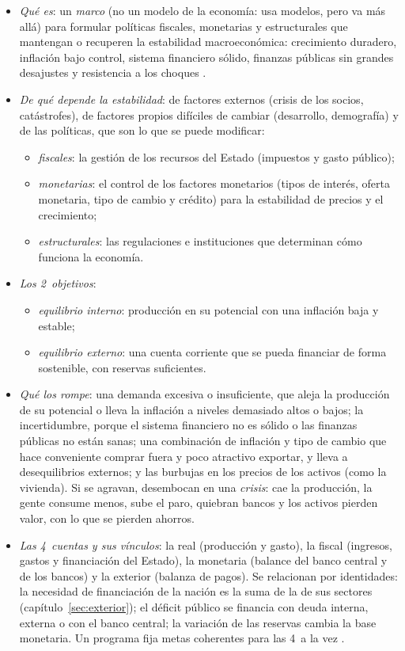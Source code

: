 \documentclass[11pt]{article}
\begin{document}
\begin{itemize}
\item \emph{Qué es}: un \emph{marco} (no un modelo de la economía: usa modelos, pero va más allá) para formular políticas fiscales, monetarias y estructurales que mantengan o recuperen la estabilidad macroeconómica: crecimiento duradero, inflación bajo control, sistema financiero sólido, finanzas públicas sin grandes desajustes y resistencia a los choques \parencite{FMI2022edXFPP}.
\item \emph{De qué depende la estabilidad}: de factores externos (crisis de los socios, catástrofes), de factores propios difíciles de cambiar (desarrollo, demografía) y de las políticas, que son lo que se puede modificar:
  \begin{itemize}
  \item \emph{fiscales}: la gestión de los recursos del Estado (impuestos y gasto público);
  \item \emph{monetarias}: el control de los factores monetarios (tipos de interés, oferta monetaria, tipo de cambio y crédito) para la estabilidad de precios y el crecimiento;
  \item \emph{estructurales}: las regulaciones e instituciones que determinan cómo funciona la economía.
  \end{itemize}
\item \emph{Los 2~objetivos}:
  \begin{itemize}
  \item \emph{equilibrio interno}: producción en su potencial con una inflación baja y estable;
  \item \emph{equilibrio externo}: una cuenta corriente que se pueda financiar de forma sostenible, con reservas suficientes.
  \end{itemize}
\item \emph{Qué los rompe}: una demanda excesiva o insuficiente, que aleja la producción de su potencial o lleva la inflación a niveles demasiado altos o bajos; la incertidumbre, porque el sistema financiero no es sólido o las finanzas públicas no están sanas; una combinación de inflación y tipo de cambio que hace conveniente comprar fuera y poco atractivo exportar, y lleva a desequilibrios externos; y las burbujas en los precios de los activos (como la vivienda). Si se agravan, desembocan en una \emph{crisis}: cae la producción, la gente consume menos, sube el paro, quiebran bancos y los activos pierden valor, con lo que se pierden ahorros.
\item \emph{Las 4~cuentas y sus vínculos}: la real (producción y gasto), la fiscal (ingresos, gastos y financiación del Estado), la monetaria (balance del banco central y de los bancos) y la exterior (balanza de pagos). Se relacionan por identidades: la necesidad de financiación de la nación es la suma de la de sus sectores (capítulo~\ref{sec:exterior}); el déficit público se financia con deuda interna, externa o con el banco central; la variación de las reservas cambia la base monetaria. Un programa fija metas coherentes para las 4~a la vez .
\end{itemize}
\end{document}
